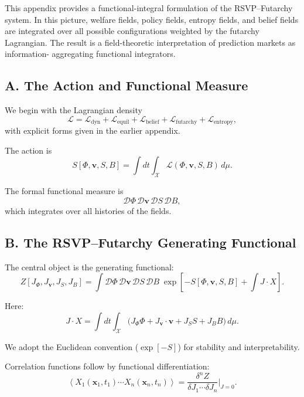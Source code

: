 \documentclass[12pt]{article}
\begin{document}
This appendix provides a functional-integral formulation of the
RSVP–Futarchy system. In this picture, welfare fields, policy fields,
entropy fields, and belief fields are integrated over all possible
configurations weighted by the futarchy Lagrangian. The result is a
field-theoretic interpretation of prediction markets as information-
aggregating functional integrators.

\subsection*{A. The Action and Functional Measure}

We begin with the Lagrangian density
\[
\mathcal{L}
=
\mathcal{L}_{\text{dyn}}
+
\mathcal{L}_{\text{equil}}
+
\mathcal{L}_{\text{belief}}
+
\mathcal{L}_{\text{futarchy}}
+
\mathcal{L}_{\text{entropy}},
\]
with explicit forms given in the earlier appendix.

The action is
\[
S[\Phi,\mathbf{v},S,B]
=
\int dt \int_{\mathcal{X}}
\mathcal{L}(\Phi,\mathbf{v},S,B)\, d\mu.
\]

The formal functional measure is
\[
\mathcal{D}\Phi
\,\mathcal{D}\mathbf{v}
\,\mathcal{D}S
\,\mathcal{D}B,
\]
which integrates over all histories of the fields.

\subsection*{B. The RSVP--Futarchy Generating Functional}

The central object is the generating functional:
\begin{equation}
\boxed{
Z[J_\Phi, J_{\mathbf{v}}, J_S, J_B]
=
\int
\mathcal{D}\Phi\,
\mathcal{D}\mathbf{v}\,
\mathcal{D}S\,
\mathcal{D}B\;
\exp\!\left[
    - S[\Phi,\mathbf{v},S,B]
    + \int J \cdot X
\right].
}
\end{equation}

Here:
\[
J\cdot X
=
\int dt \int_{\mathcal{X}}
\big( 
J_\Phi \Phi
+ J_{\mathbf{v}}\cdot\mathbf{v}
+ J_S S
+ J_B B
\big)\, d\mu.
\]

We adopt the Euclidean convention (\(\exp[-S]\)) for stability and
interpretability.

Correlation functions follow by functional differentiation:
\[
\left\langle X_1(\mathbf{x}_1,t_1)\cdots X_n(\mathbf{x}_n,t_n)\right\rangle
=
\frac{\delta^n Z}{\delta J_1 \cdots \delta J_n}
\Bigg|_{J=0}.
\]
\end{document}
